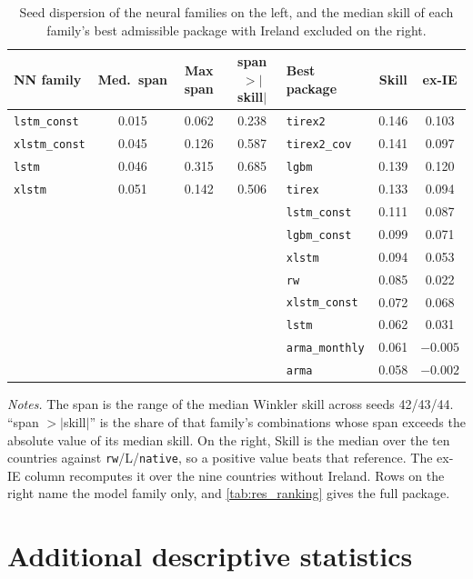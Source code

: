 \begin{table}[t]
\centering
\caption{Seed dispersion of the neural families on the left, and the median skill of each family's best admissible package with Ireland excluded on the right.}
\label{tab:app_fragility}
\begin{tabular}{lccc@{\hskip 1.2cm}lcc}
\toprule
NN family & Med.\ span & Max span & span $>|$skill$|$ & Best package & Skill & ex-IE \\
\midrule
\texttt{lstm\_const}  & 0.015 & 0.062 & 0.238 & \texttt{tirex2}       & 0.146 & 0.103 \\
\texttt{xlstm\_const} & 0.045 & 0.126 & 0.587 & \texttt{tirex2\_cov}  & 0.141 & 0.097 \\
\texttt{lstm}         & 0.046 & 0.315 & 0.685 & \texttt{lgbm}         & 0.139 & 0.120 \\
\texttt{xlstm}        & 0.051 & 0.142 & 0.506 & \texttt{tirex}        & 0.133 & 0.094 \\
                      &       &       &       & \texttt{lstm\_const}  & 0.111 & 0.087 \\
                      &       &       &       & \texttt{lgbm\_const}  & 0.099 & 0.071 \\
                      &       &       &       & \texttt{xlstm}        & 0.094 & 0.053 \\
                      &       &       &       & \texttt{rw}           & 0.085 & 0.022 \\
                      &       &       &       & \texttt{xlstm\_const} & 0.072 & 0.068 \\
                      &       &       &       & \texttt{lstm}         & 0.062 & 0.031 \\
                      &       &       &       & \texttt{arma\_monthly}& 0.061 & $-0.005$ \\
                      &       &       &       & \texttt{arma}         & 0.058 & $-0.002$ \\
\bottomrule
\end{tabular}

\vspace{4pt}
{\footnotesize
\begin{minipage}{0.98\textwidth}
\textit{Notes.} The span is the range of the median Winkler skill across seeds 42/43/44. ``span $>|$skill$|$'' is the share of that family's combinations whose span exceeds the absolute value of its median skill. On the right, Skill is the median over the ten countries against \texttt{rw}/L/\texttt{native}, so a positive value beats that reference. The ex-IE column recomputes it over the nine countries without Ireland. Rows on the right name the model family only, and \cref{tab:res_ranking} gives the full package.
\end{minipage}}
\end{table}

\section{Additional descriptive statistics}
\label{app:descriptive}

\printbibliography   %